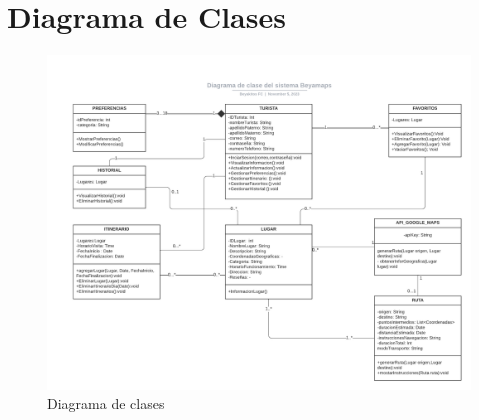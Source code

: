 \section{Diagrama de Clases}
   \begin{figure}[htbp]
        \centering
        \includegraphics[width=16.5cm]{entregable final/DiagramaClases/BEYAMAPS.png}
        \caption{Diagrama de clases}
        \label{fig:enter-label}
    \end{figure}
